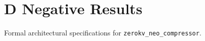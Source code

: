 \section{D Negative Results}

Formal architectural specifications for \texttt{zerokv_neo_compressor}.
